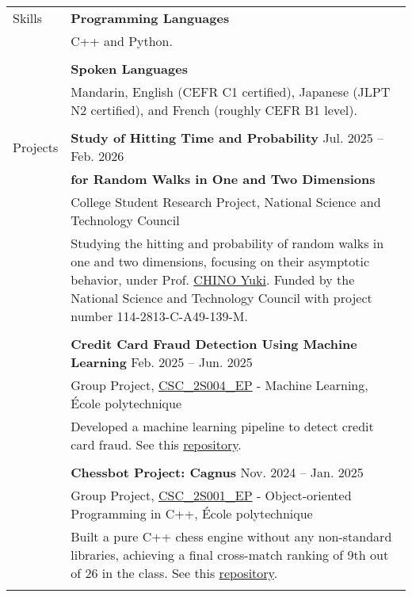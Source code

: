 \documentclass[letterpaper, 11pt]{article}
\begin{document}
\begin{center}
\begin{longtable}{p{0.81in}p{5.88in}}
        
        {\textcolor{OliveGreen}{Skills}} 
        & \textbf{Programming Languages}\\
        & C++ and Python.\\
        & \\

        & \textbf{Spoken Languages} \\
        & Mandarin, English (CEFR C1 certified), Japanese (JLPT N2 certified), and French (roughly CEFR B1 level).\\
        & \\
        

        {\textcolor{OliveGreen}{Projects}} & \textbf{Study of Hitting Time and Probability} \hfill Jul. 2025 -- Feb. 2026\\
        & \textbf{\quad \quad \quad for Random Walks in One and Two Dimensions} \\
        & College Student Research Project, National Science and Technology Council\\
        & Studying the hitting and probability of random walks in one and two dimensions, focusing on their asymptotic behavior, under Prof. \href{https://scholar.nycu.edu.tw/en/persons/yuki-chino}{CHINO Yuki}. Funded by the National Science and Technology Council with project number 114-2813-C-A49-139-M.\\
        & \\

        & \textbf{Credit Card Fraud Detection Using Machine Learning} \hfill Feb. 2025 -- Jun. 2025\\
        & Group Project, \href{https://synapses.polytechnique.fr/catalogue/2024-2025/ue/47/CSC-2S004-EP-machine-learning?from=D12}{CSC\_2S004\_EP} - Machine Learning, École polytechnique\\
        & Developed a machine learning pipeline to detect credit card fraud. See this \href{https://github.com/eiken59/ml_project/blob/main/README.md}{repository}.\\
        & \\

        & \textbf{Chessbot Project: Cagnus} \hfill Nov. 2024 -- Jan. 2025\\
        & Group Project, \href{https://synapses.polytechnique.fr/catalogue/2024-2025/ue/32/CSC-2F001-EP-object-oriented-programming-in-c?from=D12}{CSC\_2S001\_EP} - Object-oriented Programming in C++, École polytechnique\\
        & Built a pure C++ chess engine without any non-standard libraries, achieving a final cross-match ranking of 9th out of 26 in the class. See this \href{https://github.com/jetzypetz/chess_bot/blob/main/docs/README.md}{repository}.\\
        & \\
        

\end{longtable}
\end{center}
\end{document}
